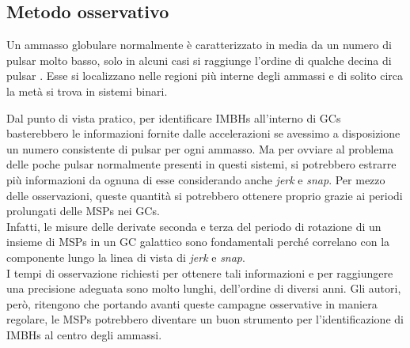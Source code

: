 \subsection{Metodo osservativo}
\label{subsec:pulsar_timing}

Un ammasso globulare normalmente è caratterizzato in media da un numero di pulsar molto basso, solo in alcuni casi si raggiunge l'ordine di qualche decina di pulsar \cite{pulsar:online}. Esse si localizzano nelle regioni più interne degli ammassi e di solito circa la metà si trova in sistemi binari.

Dal punto di vista pratico, per identificare IMBHs all'interno di GCs basterebbero le informazioni fornite dalle accelerazioni se avessimo a disposizione un numero consistente di pulsar per ogni ammasso. Ma per ovviare al problema delle poche pulsar normalmente presenti in questi sistemi, si potrebbero estrarre più informazioni da ognuna di esse considerando anche \textit{jerk} e \textit{snap}. Per mezzo delle osservazioni, queste quantità si potrebbero ottenere proprio grazie ai periodi prolungati delle MSPs nei GCs.\\
Infatti, le misure delle derivate seconda e terza del periodo di rotazione di un insieme di MSPs in un GC galattico sono fondamentali perché correlano con la componente lungo la linea di vista di \textit{jerk} e \textit{snap}.\\
I tempi di osservazione richiesti per ottenere tali informazioni e per raggiungere una precisione adeguata sono molto lunghi, dell'ordine di diversi anni. Gli autori, però, ritengono che portando avanti queste campagne osservative in maniera regolare, le MSPs potrebbero diventare un buon strumento per l'identificazione di IMBHs al centro degli ammassi.

